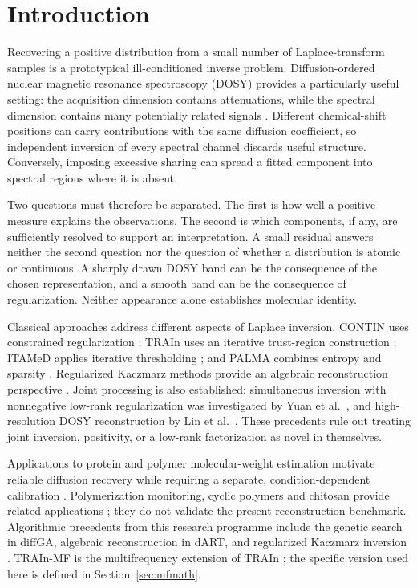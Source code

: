 \section{Introduction}
Recovering a positive distribution from a small number of Laplace-transform samples is a prototypical ill-conditioned inverse problem. Diffusion-ordered nuclear magnetic resonance spectroscopy (DOSY) provides a particularly useful setting: the acquisition dimension contains attenuations, while the spectral dimension contains many potentially related signals \cite{stejskal,morris}. Different chemical-shift positions can carry contributions with the same diffusion coefficient, so independent inversion of every spectral channel discards useful structure. Conversely, imposing excessive sharing can spread a fitted component into spectral regions where it is absent.

Two questions must therefore be separated. The first is how well a positive measure explains the observations. The second is which components, if any, are sufficiently resolved to support an interpretation. A small residual answers neither the second question nor the question of whether a distribution is atomic or continuous. A sharply drawn DOSY band can be the consequence of the chosen representation, and a smooth band can be the consequence of regularization. Neither appearance alone establishes molecular identity.

Classical approaches address different aspects of Laplace inversion. CONTIN uses constrained regularization \cite{contin}; TRAIn uses an iterative trust-region construction \cite{train}; ITAMeD applies iterative thresholding \cite{itamed}; and PALMA combines entropy and sparsity \cite{palma}. Regularized Kaczmarz methods provide an algebraic reconstruction perspective \cite{kaczmarz}. Joint processing is also established: simultaneous inversion with nonnegative low-rank regularization was investigated by Yuan et al.\ \cite{silt}, and high-resolution DOSY reconstruction by Lin et al.\ \cite{lin}. These precedents rule out treating joint inversion, positivity, or a low-rank factorization as novel in themselves.

Applications to protein and polymer molecular-weight estimation motivate reliable diffusion recovery while requiring a separate, condition-dependent calibration \cite{arrabal2016,arrabal2016correction,protein,concentration}. Polymerization monitoring, cyclic polymers and chitosan provide related applications \cite{photo2026,cyclic2021,cyclic2023,chitosan2026}; they do not validate the present reconstruction benchmark. Algorithmic precedents from this research programme include the genetic search in diffGA, algebraic reconstruction in dART, and regularized Kaczmarz inversion \cite{diffga,dart,kaczmarz}. TRAIn-MF is the multifrequency extension of TRAIn \cite{train,mfv31}; the specific version used here is defined in Section~\ref{sec:mfmath}.

